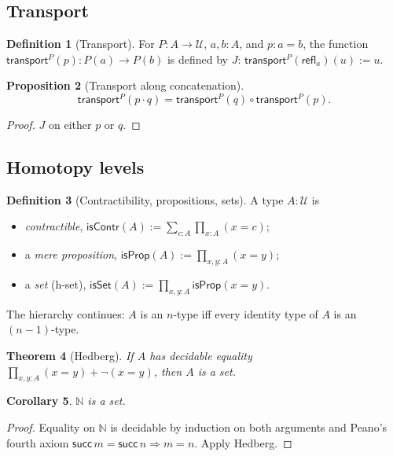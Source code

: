 \documentclass[12pt]{article}
\newtheorem{theorem}{Theorem}[section]
\newtheorem{proposition}[theorem]{Proposition}
\newtheorem{corollary}[theorem]{Corollary}
\theoremstyle{definition}
\newtheorem{definition}[theorem]{Definition}
\theoremstyle{remark}
\newcommand{\U}{\mathcal{U}}
\newcommand{\N}{\mathbb{N}}
\newcommand{\refl}{\mathsf{refl}}
\newcommand{\suc}{\mathsf{succ}}
\newcommand{\transport}{\mathsf{transport}}
\newcommand{\isContr}{\mathsf{isContr}}
\newcommand{\isProp}{\mathsf{isProp}}
\newcommand{\isSet}{\mathsf{isSet}}
\begin{document}
\subsection{Transport}

\begin{definition}[Transport]
\label{def:transport}
For $P : A \to \U$, $a, b : A$, and $p : a = b$, the function
$\transport^P(p) : P(a) \to P(b)$ is defined by $J$:
$\transport^P(\refl_a)(u) := u$.
\end{definition}

\begin{proposition}[Transport along concatenation]
\label{prop:trans-concat}
\[
\transport^P(p \cdot q) = \transport^P(q) \circ \transport^P(p).
\]
\end{proposition}

\begin{proof}
$J$ on either $p$ or $q$.
\end{proof}

\subsection{Homotopy levels}

\begin{definition}[Contractibility, propositions, sets]
\label{def:hlevel}
A type $A : \U$ is
\begin{itemize}
\item \emph{contractible}, $\isContr(A) := \sum_{c : A} \prod_{x : A} (x = c)$;
\item a \emph{mere proposition}, $\isProp(A) := \prod_{x, y : A} (x = y)$;
\item a \emph{set} (h-set), $\isSet(A) := \prod_{x, y : A} \isProp(x = y)$.
\end{itemize}
The hierarchy continues: $A$ is an $n$-type iff every identity type of $A$
is an $(n-1)$-type.
\end{definition}

\begin{theorem}[Hedberg]
\label{thm:hedberg}
If $A$ has decidable equality $\prod_{x, y : A} (x = y) + \neg(x = y)$, then
$A$ is a set.
\end{theorem}

\begin{corollary}
\label{cor:N-set}
$\N$ is a set.
\end{corollary}

\begin{proof}
Equality on $\N$ is decidable by induction on both arguments and Peano's
fourth axiom $\suc\,m = \suc\,n \Rightarrow m = n$. Apply Hedberg.
\end{proof}
\end{document}
